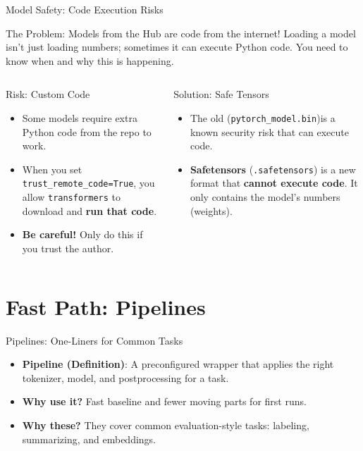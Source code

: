\documentclass[aspectratio=169]{beamer}
\begin{document}
\begin{frame}{Model Safety: Code Execution Risks}
    \begin{block}{The Problem: Models from the Hub are code from the internet!}
    Loading a model isn't just loading numbers; sometimes it can execute Python code. You need to know when and why this is happening.
    \end{block}
    
    \begin{columns}[T]
    \begin{column}{0.5\linewidth}
        \begin{alertblock}{Risk: Custom Code }
            \begin{itemize}
                \item Some models require extra Python code from the repo to work.
                \item When you set \texttt{trust\_remote\_code=True}, you allow \texttt{transformers} to download and \textbf{run that code}.
                \item \textbf{Be careful!} Only do this if you trust the author.
            \end{itemize}
        \end{alertblock}
    \end{column}
    \begin{column}{0.5\linewidth}
        \begin{exampleblock}{Solution: Safe Tensors}
             \begin{itemize}
                \item The old (\texttt{pytorch\_model.bin})is a known security risk that can execute code.
                \item \textbf{Safetensors} (\texttt{.safetensors}) is a new format that \textbf{cannot execute code}. It only contains the model's numbers (weights).
               \end{itemize}
        \end{exampleblock}
    \end{column}
    \end{columns}
\end{frame}

\section{Fast Path: Pipelines}

\begin{frame}[fragile]{Pipelines: One-Liners for Common Tasks}
 \begin{itemize}
    \item \textbf{Pipeline (Definition)}: A preconfigured wrapper that applies the right tokenizer, model, and postprocessing for a task.
    \item \textbf{Why use it?} Fast baseline and fewer moving parts for first runs.
    \item \textbf{Why these?} They cover common evaluation-style tasks: labeling, summarizing, and embeddings.
  \end{itemize} 
  \vspace{0.5em}

\end{frame}
\end{document}
